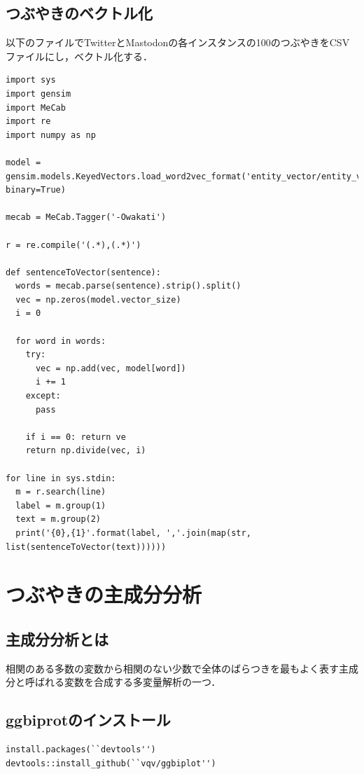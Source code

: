  \subsection{つぶやきのベクトル化}
以下のファイルでTwitterとMastodonの各インスタンスの100のつぶやきをCSVファイルにし，ベクトル化する．
\begin{lstlisting}[breaklines = true, basicstyle=\ttfamily\footnotesize, frame=single]
import sys
import gensim
import MeCab
import re
import numpy as np

model = gensim.models.KeyedVectors.load_word2vec_format('entity_vector/entity_vector.model.bin', binary=True)

mecab = MeCab.Tagger('-Owakati')

r = re.compile('(.*),(.*)')

def sentenceToVector(sentence):
  words = mecab.parse(sentence).strip().split()
  vec = np.zeros(model.vector_size)
  i = 0

  for word in words:
    try:
      vec = np.add(vec, model[word])
      i += 1
    except:
      pass
      
    if i == 0: return ve
    return np.divide(vec, i)

for line in sys.stdin:
  m = r.search(line)
  label = m.group(1)
  text = m.group(2)
  print('{0},{1}'.format(label, ','.join(map(str, list(sentenceToVector(text))))))
\end{lstlisting}
 \newpage
\section{つぶやきの主成分分析}

\subsection{主成分分析とは}
相関のある多数の変数から相関のない少数で全体のばらつきを最もよく表す主成分と呼ばれる変数を合成する多変量解析の一つ．


\newpage

\subsection{ggbiprotのインストール}
\begin{verbatim}
install.packages(``devtools'')
devtools::install_github(``vqv/ggbiplot'')
\end{verbatim}
\newpage
